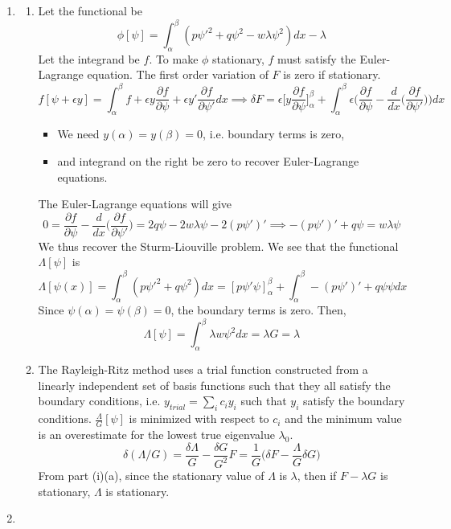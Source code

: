 \documentclass[a4paper]{article}
\begin{document}
\begin{ans}\leavevmode
\begin{enumerate}[label=(\roman*)]
\item 
\begin{enumerate}[label=(\alph*)]
\item Let the functional be 
$$\phi[\psi]=\int_\alpha^\beta(p\psi'^2+q\psi^2-w\lambda\psi^2)dx-\lambda$$
Let the integrand be $f$. To make $\phi$ stationary, $f$ must satisfy the Euler-Lagrange equation. The first order variation of $F$ is zero if stationary.
$$f[\psi+\epsilon y]=\int_\alpha^\beta f+\epsilon y\frac{\partial f}{\partial\psi}+\epsilon y'\frac{\partial f}{\partial\psi'}dx\implies\delta F=\epsilon\bigg[y\frac{\partial f}{\partial\psi}\bigg]_\alpha^\beta+\int_\alpha^\beta\epsilon\bigg(\frac{\partial f}{\partial\psi}-\frac{d}{dx}\bigg(\frac{\partial f}{\partial\psi'}\bigg)\bigg)dx$$
\begin{itemize}
    \item We need $y(\alpha)=y(\beta)=0$, i.e. boundary terms is zero,
    \item and integrand on the right be zero to recover Euler-Lagrange equations.
\end{itemize}
The Euler-Lagrange equations will give
$$0=\frac{\partial f}{\partial\psi}-\frac{d}{dx}\bigg(\frac{\partial f}{\partial\psi'}\bigg)=2q\psi-2w\lambda\psi-2(p\psi')'\implies -(p\psi')'+q\psi=w\lambda\psi$$
We thus recover the Sturm-Liouville problem. We see that the functional $\Lambda[\psi]$ is
$$\Lambda[\psi(x)]=\int_\alpha^\beta(p\psi'^2+q\psi^2)dx=[p\psi'\psi]_\alpha^\beta+\int_\alpha^\beta-(p\psi')'+q\psi\psi dx$$
Since $\psi(\alpha)=\psi(\beta)=0$, the boundary terms is zero. Then, $$\Lambda[\psi]=\int_\alpha^\beta\lambda w\psi^2dx=\lambda G=\lambda$$
\item The Rayleigh-Ritz method uses a trial function constructed from a linearly independent set of basis functions such that they all satisfy the boundary conditions, i.e. $y_{trial}=\sum_ic_iy_i$ such that $y_i$ satisfy the boundary conditions. $\frac{\Lambda}{G}[\psi]$ is minimized with respect to $c_i$ and the minimum value is an overestimate for the lowest true eigenvalue $\lambda_0$.
$$\delta(\Lambda/G)=\frac{\delta\Lambda}{G}-\frac{\delta G}{G^2}F=\frac{1}{G}\bigg(\delta F-\frac{\Lambda}{G}\delta G\bigg)$$
From part (i)(a), since the stationary value of $\Lambda$ is $\lambda$, then if $F-\lambda G$ is stationary, $\Lambda$ is stationary.
\end{enumerate}
\item

\end{enumerate}
\end{ans}
\end{document}
